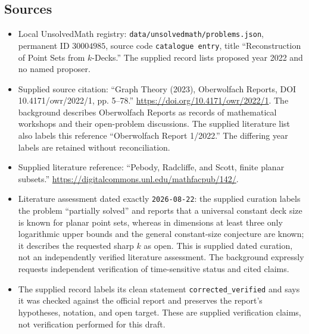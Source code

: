 \documentclass[11pt]{article}
\begin{document}
\subsection{Sources}
\begin{itemize}
\item Local UnsolvedMath registry: \texttt{data/unsolvedmath/problems.json}, permanent ID \(30004985\), source code \texttt{catalogue entry}, title ``Reconstruction of Point Sets from \(k\)-Decks.'' The supplied record lists proposed year 2022 and no named proposer.
\item Supplied source citation: ``Graph Theory (2023), Oberwolfach Reports, DOI 10.4171/owr/2022/1, pp. 5--78.'' \url{https://doi.org/10.4171/owr/2022/1}. The background describes Oberwolfach Reports as records of mathematical workshops and their open-problem discussions. The supplied literature list also labels this reference ``Oberwolfach Report 1/2022.'' The differing year labels are retained without reconciliation.
\item Supplied literature reference: ``Pebody, Radcliffe, and Scott, finite planar subsets.'' \url{https://digitalcommons.unl.edu/mathfacpub/142/}.
\item Literature assessment dated exactly \texttt{2026-08-22}: the supplied curation labels the problem ``partially solved'' and reports that a universal constant deck size is known for planar point sets, whereas in dimensions at least three only logarithmic upper bounds and the general constant-size conjecture are known; it describes the requested sharp \(k\) as open. This is supplied dated curation, not an independently verified literature assessment. The background expressly requests independent verification of time-sensitive status and cited claims.
\item The supplied record labels its clean statement \texttt{corrected\_verified} and says it was checked against the official report and preserves the report's hypotheses, notation, and open target. These are supplied verification claims, not verification performed for this draft.
\end{itemize}
\end{document}
